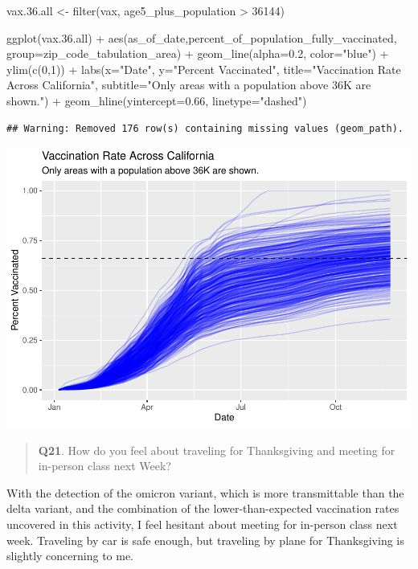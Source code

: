 \documentclass[
]{article}
\newenvironment{Shaded}{\begin{snugshade}}{\end{snugshade}}
\newcommand{\AttributeTok}[1]{\textcolor[rgb]{0.77,0.63,0.00}{#1}}
\newcommand{\DecValTok}[1]{\textcolor[rgb]{0.00,0.00,0.81}{#1}}
\newcommand{\FloatTok}[1]{\textcolor[rgb]{0.00,0.00,0.81}{#1}}
\newcommand{\FunctionTok}[1]{\textcolor[rgb]{0.00,0.00,0.00}{#1}}
\newcommand{\NormalTok}[1]{#1}
\newcommand{\OtherTok}[1]{\textcolor[rgb]{0.56,0.35,0.01}{#1}}
\newcommand{\SpecialCharTok}[1]{\textcolor[rgb]{0.00,0.00,0.00}{#1}}
\newcommand{\StringTok}[1]{\textcolor[rgb]{0.31,0.60,0.02}{#1}}
\begin{document}
\begin{Shaded}
\begin{Highlighting}[]
\NormalTok{vax.}\FloatTok{36.}\NormalTok{all }\OtherTok{\textless{}{-}} \FunctionTok{filter}\NormalTok{(vax, age5\_plus\_population }\SpecialCharTok{\textgreater{}} \DecValTok{36144}\NormalTok{)}


\FunctionTok{ggplot}\NormalTok{(vax.}\FloatTok{36.}\NormalTok{all) }\SpecialCharTok{+}
  \FunctionTok{aes}\NormalTok{(as\_of\_date,percent\_of\_population\_fully\_vaccinated, }
      \AttributeTok{group=}\NormalTok{zip\_code\_tabulation\_area) }\SpecialCharTok{+}
  \FunctionTok{geom\_line}\NormalTok{(}\AttributeTok{alpha=}\FloatTok{0.2}\NormalTok{, }\AttributeTok{color=}\StringTok{"blue"}\NormalTok{) }\SpecialCharTok{+}
  \FunctionTok{ylim}\NormalTok{(}\FunctionTok{c}\NormalTok{(}\DecValTok{0}\NormalTok{,}\DecValTok{1}\NormalTok{)) }\SpecialCharTok{+}
  \FunctionTok{labs}\NormalTok{(}\AttributeTok{x=}\StringTok{"Date"}\NormalTok{, }\AttributeTok{y=}\StringTok{"Percent Vaccinated"}\NormalTok{,}
       \AttributeTok{title=}\StringTok{"Vaccination Rate Across California"}\NormalTok{,}
       \AttributeTok{subtitle=}\StringTok{"Only areas with a population above 36K are shown."}\NormalTok{) }\SpecialCharTok{+}
  \FunctionTok{geom\_hline}\NormalTok{(}\AttributeTok{yintercept=}\FloatTok{0.66}\NormalTok{, }\AttributeTok{linetype=}\StringTok{"dashed"}\NormalTok{)}
\end{Highlighting}
\end{Shaded}

\begin{verbatim}
## Warning: Removed 176 row(s) containing missing values (geom_path).
\end{verbatim}

\includegraphics{Class17_files/figure-latex/unnamed-chunk-38-1.pdf}

\begin{quote}
\textbf{Q21}. How do you feel about traveling for Thanksgiving and
meeting for in-person class next Week?
\end{quote}

With the detection of the omicron variant, which is more transmittable
than the delta variant, and the combination of the lower-than-expected
vaccination rates uncovered in this activity, I feel hesitant about
meeting for in-person class next week. Traveling by car is safe enough,
but traveling by plane for Thanksgiving is slightly concerning to me.
\end{document}
